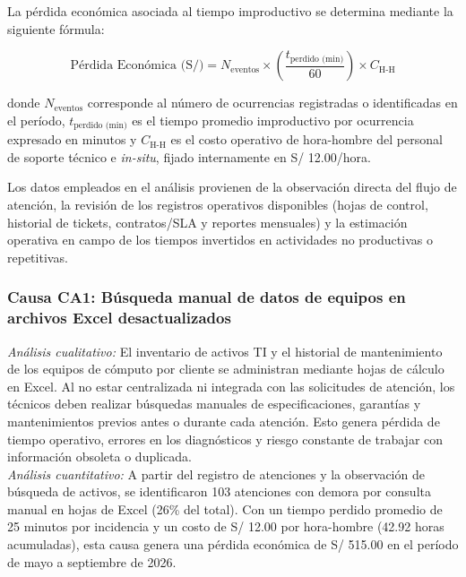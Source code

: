 La pérdida económica asociada al tiempo improductivo se determina mediante la siguiente fórmula:

\begin{equation*}
\text{Pérdida Económica (S/)} = N_{\text{eventos}} \times \left(\frac{t_{\text{perdido (min)}}}{60}\right) \times C_{\text{H-H}}
\end{equation*}

donde $N_{\text{eventos}}$ corresponde al número de ocurrencias registradas o identificadas en el período, $t_{\text{perdido (min)}}$ es el tiempo promedio improductivo por ocurrencia expresado en minutos y $C_{\text{H-H}}$ es el costo operativo de hora-hombre del personal de soporte técnico e \textit{in-situ}, fijado internamente en S/ 12.00/hora.

Los datos empleados en el análisis provienen de la observación directa del flujo de atención, la revisión de los registros operativos disponibles (hojas de control, historial de tickets, contratos/SLA y reportes mensuales) y la estimación operativa en campo de los tiempos invertidos en actividades no productivas o repetitivas.

\subsubsection{Causa CA1: Búsqueda manual de datos de equipos en archivos Excel desactualizados}
\noindent \textit{Análisis cualitativo:} El inventario de activos TI y el historial de mantenimiento de los equipos de cómputo por cliente se administran mediante hojas de cálculo en Excel. Al no estar centralizada ni integrada con las solicitudes de atención, los técnicos deben realizar búsquedas manuales de especificaciones, garantías y mantenimientos previos antes o durante cada atención. Esto genera pérdida de tiempo operativo, errores en los diagnósticos y riesgo constante de trabajar con información obsoleta o duplicada. \\

\noindent \textit{Análisis cuantitativo:} 
A partir del registro de atenciones y la observación de búsqueda de activos, se identificaron 103 atenciones con demora por consulta manual en hojas de Excel (26\% del total). Con un tiempo perdido promedio de 25 minutos por incidencia y un costo de S/ 12.00 por hora-hombre (42.92 horas acumuladas), esta causa genera una pérdida económica de S/ 515.00 en el período de mayo a septiembre de 2026.

